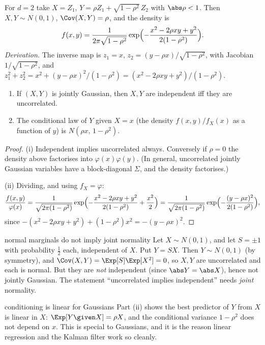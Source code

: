 For $d=2$ take $X=Z_1$, $Y=\rho Z_1+\sqrt{1-\rho^2}\,Z_2$ with $\abs\rho<1$. Then
$X,Y\sim N(0,1)$, $\Cov(X,Y)=\rho$, and the density is
\[
f(x,y)=\frac1{2\pi\sqrt{1-\rho^2}}\exp\Bigl(-\frac{x^2-2\rho xy+y^2}{2(1-\rho^2)}\Bigr).
\]
\emph{Derivation.} The inverse map is $z_1=x$, $z_2=(y-\rho x)/\sqrt{1-\rho^2}$, with
Jacobian $1/\sqrt{1-\rho^2}$, and
$z_1^2+z_2^2=x^2+(y-\rho x)^2/(1-\rho^2)=(x^2-2\rho xy+y^2)/(1-\rho^2)$.

\begin{theorem}\label{thm:bvn}
\begin{enumerate}[label=(\roman*)]
\item If $(X,Y)$ is jointly Gaussian, then $X,Y$ are independent iff they are
uncorrelated.
\item The conditional law of $Y$ given $X=x$ (the density $f(x,y)/f_X(x)$ as a
function of $y$) is $N(\rho x,\,1-\rho^2)$.
\end{enumerate}
\end{theorem}
\begin{proof}
(i) Independent implies uncorrelated always. Conversely if $\rho=0$ the density above
factorises into $\varphi(x)\varphi(y)$. (In general, uncorrelated jointly Gaussian
variables have a block-diagonal $\Sigma$, and the density factorises.)

(ii) Dividing, and using $f_X=\varphi$:
\[
\frac{f(x,y)}{\varphi(x)}=\frac1{\sqrt{2\pi(1-\rho^2)}}
\exp\Bigl(-\frac{x^2-2\rho xy+y^2}{2(1-\rho^2)}+\frac{x^2}2\Bigr)
=\frac1{\sqrt{2\pi(1-\rho^2)}}\exp\Bigl(-\frac{(y-\rho x)^2}{2(1-\rho^2)}\Bigr),
\]
since $-(x^2-2\rho xy+y^2)+(1-\rho^2)x^2=-(y-\rho x)^2$.
\end{proof}

\begin{pitfall}{normal marginals do not imply joint normality}
Let $X\sim N(0,1)$, and let $S=\pm1$ with probability $\tfrac12$ each, independent
of $X$. Put $Y=SX$. Then $Y\sim N(0,1)$ (by symmetry), and $\Cov(X,Y)=\Exp[S]\Exp[X^2]=0$, so
$X,Y$ are uncorrelated and each is normal. But they are \emph{not} independent
(since $\abs Y=\abs X$), hence not jointly Gaussian. The statement
``uncorrelated implies independent'' needs \emph{joint} normality.
\end{pitfall}

\begin{nuance}{conditioning is linear for Gaussians}
Part (ii) shows the best predictor of $Y$ from $X$ is linear in $X$:
$\Exp[Y\given X]=\rho X$, and the conditional variance $1-\rho^2$ does not depend on
$x$. This is special to Gaussians, and it is the reason linear regression and the
Kalman filter work so cleanly.
\end{nuance}

